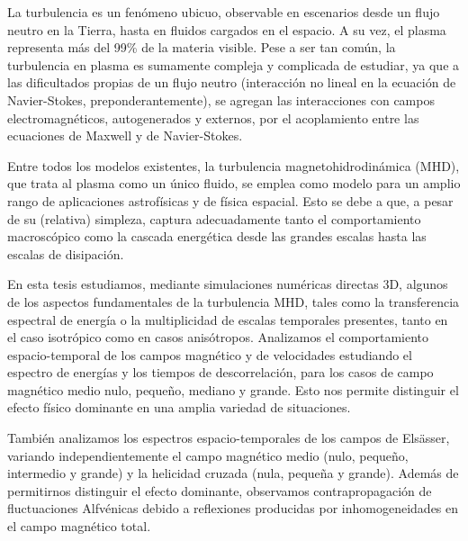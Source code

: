 La turbulencia es un fenómeno ubicuo, observable en escenarios desde
un flujo neutro en la Tierra, hasta en fluidos cargados en el
espacio. A su vez, el plasma representa más del 99\% de la materia
visible. Pese a ser tan común, la turbulencia en plasma es sumamente
compleja y complicada de estudiar, ya que a las dificultados propias
de un flujo neutro (interacción no lineal en la ecuación de
Navier-Stokes, preponderantemente), se agregan las interacciones con
campos electromagnéticos, autogenerados y externos, por el
acoplamiento entre las ecuaciones de Maxwell y de Navier-Stokes.

Entre todos los modelos existentes, la turbulencia
magnetohidrodinámica (MHD), que trata al plasma como un único fluido,
se emplea como modelo para un amplio rango de aplicaciones
astrofísicas y de física espacial. Esto se debe a que, a pesar de su
(relativa) simpleza, captura adecuadamente tanto el comportamiento
macroscópico como la cascada energética desde las grandes escalas
hasta las escalas de disipación.

En esta tesis estudiamos, mediante simulaciones numéricas directas 3D,
algunos de los aspectos fundamentales de la turbulencia MHD, tales
como la transferencia espectral de energía o la multiplicidad de
escalas temporales presentes, tanto en el caso isotrópico como en
casos anisótropos. Analizamos el comportamiento espacio-temporal de
los campos magnético y de velocidades estudiando el espectro de
energías y los tiempos de descorrelación, para los casos de campo
magnético medio nulo, pequeño, mediano y grande. Esto nos permite
distinguir el efecto físico dominante en una amplia variedad de
situaciones.

También analizamos los espectros espacio-temporales de los campos de
Els\"asser, variando independientemente el campo magnético medio
(nulo, pequeño, intermedio y grande) y la helicidad cruzada (nula,
pequeña y grande). Además de permitirnos distinguir el efecto
dominante, observamos contrapropagación de fluctuaciones Alfvénicas
debido a reflexiones producidas por inhomogeneidades en el campo
magnético total.
